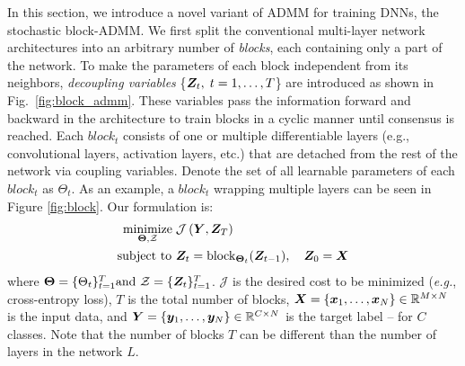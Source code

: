 In this section, we introduce a novel variant of ADMM for training DNNs, the stochastic block-ADMM. We first split the conventional multi-layer network architectures into an arbitrary number of \emph{blocks}, each containing only a part of the network. To make the parameters of each block independent from its neighbors, \emph{decoupling variables} \{${\bm{Z}}_t, \; t=1, \dots, T$\} are introduced as shown in Fig.~\ref{fig:block_admm}. These variables pass the information forward and backward in the architecture to train blocks in a cyclic manner until consensus is reached. Each $block_t$  consists of one or multiple differentiable layers (e.g., convolutional layers, activation layers, etc.) that are detached from the rest of the network via coupling variables. Denote the set of all learnable parameters of each $block_t$ as $\Theta_t$. As an example, a $block_t$ wrapping multiple layers can be seen in Figure \ref{fig:block}. Our formulation is:
\begin{align} \label{eq:ourformulation}
	\operatorname*{\rm minimize}_{ {\bm \Theta}, \mathcal{Z}}\; &\mathcal{J}\left({\bm{Y}}, {\bm{Z}}_{T} \right) 
	 \\
 {\rm subject~to} ~ &\bm Z_t = \mathrm{block}_{\bm \Theta_t}(\bm Z_{t-1}), \quad {\bm{Z}}_{0} = {\bm{X}} \nonumber
\end{align}
where ${\bf \Theta} = \{\Theta_t\}_{t=1}^{T} \text{and } \mathcal{Z} = \{{\bm{Z}}_t\}_{t=1}^{T}$. $\mathcal{J}$ is the desired cost to be minimized (\textit{e.g.}, cross-entropy loss), $T$ is the total number of blocks, ${\bm{X}} = \{ {\bm{x}}_1,\dots, {\bm{x}}_N \} \in  \mathbb{R}^{M \times N}$ is the input data, and ${\bm{Y}} = \{{\bm{y}}_1,\dots, {\bm{y}}_N \} \in \mathbb{R}^{C \times N}$ is the target label -- for $C$ classes. Note that the number of blocks $T$ can be different than the number of layers in the network $L$.

